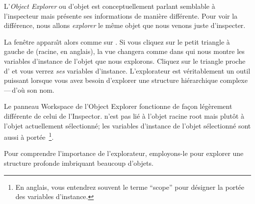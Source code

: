 \documentclass[a4paper,10pt,twoside]{book}
\begin{document}
L'\emph{Object Explorer} ou  d'objet est conceptuellement parlant semblable \`a l'inspecteur mais pr\'esente ses informations de mani\`ere diff\'erente.
Pour voir la diff\'erence, nous allons \emph{explorer} le m\^eme objet
que nous venons juste d'inspecter.

La fen\^etre  appara\^{\i}t alors comme sur
 .
Si vous cliquez sur le petit triangle \`a gauche de  (racine, en anglais), la vue changera comme dans  qui
nous montre les variables d'instance de l'objet que nous explorons.
Cliquez sur le triangle proche d' et vous verrez
\emph{ses} variables d'instance.
L'explorateur est v\'eritablement un outil puissant lorsque vous avez besoin
d'explorer une structure hi\'erarchique complexe\,---\,d'o\`u son nom.

Le panneau Workspace de l'Object Explorer fonctionne de fa\c{c}on
 l\'eg\`erement diff\'erente de celui de l'Inspector.
 n'est pas li\'e \`a l'objet racine root mais plut\^ot
\`a l'objet actuellement s\'electionn\'e; les variables d'instance de
l'objet s\'electionn\'e sont aussi \`a port\'ee~\footnote{En anglais, vous
entendrez souvent le terme ``scope'' pour d\'esigner la port\'ee des
variables d'instance.}.

Pour comprendre l'importance de l'explorateur, employons-le pour
explorer une structure profonde imbriquant beaucoup d'objets.

\end{document}
